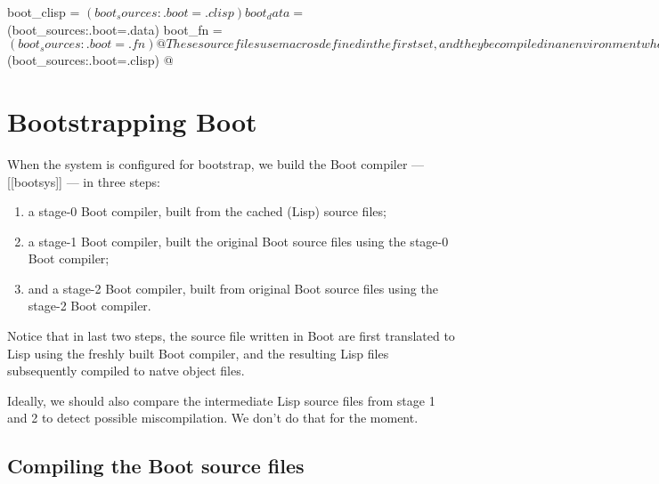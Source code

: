 \documentclass{article}
\begin{document}
boot_clisp = $(boot_sources:.boot=.clisp)
boot_data = $(boot_sources:.boot=.data)
boot_fn = $(boot_sources:.boot=.fn)
@
These source files use macros defined in the first set, and they be compiled
in an environment where those macros are present.

Since the Boot language is defined as a syntactic sugar over Lisp
(a reasonably tasty sugar), the
the second set of source files (written in Boot) is first translated
to Lisp, and the result of that translation is subsequently compiled to
native object files.

Partly for bootstrapping reasons, and partly because Axiom (therefore
Boot) is not yet widespread, the pamphlets for the source files written
in Boot currently keep a cache of their translated versions.  Hopefully
the maintainance of that cache will be unnecessary as the build machinery
becomes more and more improved, and Axiom gets in widespread use.
<<environment>>=
boot_cached_clisp = $(boot_sources:.boot=.clisp)
@

\section{Bootstrapping Boot}
\label{sec:bootstrapping}

When the system is configured for bootstrap, we build the Boot compiler ---
[[bootsys]] --- in three steps:
\begin{enumerate}
\item a stage-0 Boot compiler, built from the cached (Lisp) source files;

\item a stage-1 Boot compiler, built the original Boot source files using the
  stage-0 Boot compiler;

\item and a stage-2 Boot compiler, built from original Boot source files
  using the stage-2 Boot compiler.
\end{enumerate}
Notice that in last two steps, the source file written in Boot are first
translated to Lisp using the freshly built Boot compiler, and the resulting
Lisp files subsequently compiled to natve object files.

Ideally, we should also compare the intermediate Lisp source files from
stage 1 and 2 to detect possible miscompilation.  We don't do that
for the moment.

\subsection{Compiling the Boot source files}
\label{sec:bootstrapping:source-files}
\end{document}
